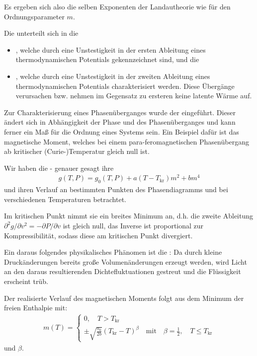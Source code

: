 Es ergeben sich also die selben Exponenten der Landautheorie wie für den Ordnungsparameter $m$.  
\begin{summary}
    Die  unterteilt sich in die
    \begin{itemize}
        \item {}, welche durch eine Unstestigkeit in der ersten Ableitung eines thermodynamischen Potentials gekennzeichnet sind, und die
        \item {}, welche durch eine Unstestigkeit in der zweiten Ableitung eines thermodynamischen Potentials charakterisiert werden. Diese Übergänge verursachen bzw. nehmen im Gegensatz zu ersteren keine latente Wärme auf.
    \end{itemize}
Zur Charakterisierung eines Phasenüberganges wurde der  eingeführt. Dieser ändert sich in Abhängigkeit der Phase und des Phasenüberganges und kann ferner ein Maß für die Ordnung eines Systems sein. Ein Beispiel dafür ist das magnetische Moment, welches bei einem para-feromagnetischen Phasenübergang ab kritischer (Curie-)Temperatur gleich null ist.

Wir haben die  - genauer gesagt ihre 
\begin{align*}
    g(T,P)=g_0(T,P)+a(T-T_\mathrm{kr})m^2+bm^4
\end{align*}
und ihren Verlauf an bestimmten Punkten des Phasendiagramms und bei verschiedenen Temperaturen betrachtet.

Im kritischen Punkt nimmt sie ein breites Minimum an, d.h. die zweite Ableitung $\partial^2 g/\partial v^2=-\partial P/\partial v$ ist gleich null, das Inverse ist proportional zur Kompressibilität, sodass diese am kritischen Punkt divergiert. 

Ein daraus folgendes physikalisches Phänomen ist die : Da durch kleine Druckänderungen bereits große Volumenänderungen erzeugt werden, wird Licht an den daraus resultierenden Dichtefluktuationen gestreut und die Flüssigkeit erscheint trüb.

Der realisierte Verlauf des magnetischen Moments folgt aus dem Minimum der freien Enthalpie mit:
\begin{align*}
    m(T)=\left\{
    \begin{aligned}
        0, \quad T>T_\mathrm{kr}\\
        \pm \sqrt{\frac{a_0}{2b}}\left(T_\mathrm{kr}-T\right)^\beta\quad \mathrm{mit} \quad \beta=\frac{1}{2}, \quad T\leq T_\mathrm{kr}
    \end{aligned}
    \right.
\end{align*}
und  $\beta$.


\end{summary}
